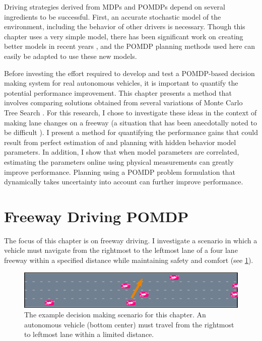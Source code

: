 Driving strategies derived from MDPs and POMDPs depend on several ingredients to be successful.
First, an accurate stochastic model of the environment, including the behavior of other drivers is necessary. 
Though this chapter uses a very simple model, there has been significant work on creating better models in recent years \cite{grindele2015trafficmodel, WheelerRobbelKochenderfer2015, sadigh2014}, and the POMDP planning methods used here can easily be adapted to use these new models.

Before investing the effort required to develop and test a POMDP-based decision making system for real autonomous vehicles, it is important to quantify the potential performance improvement.
This chapter presents a method that involves comparing solutions obtained from several variations of Monte Carlo Tree Search \cite{browne2012mcts}.
For this research, I chose to investigate these ideas in the context of making lane changes on a freeway (a situation that has been anecdotally noted to be difficult \cite{naughton2015freeway}).
I present a method for quantifying the performance gains that could result from perfect estimation of and planning with hidden behavior model parameters.
In addition, I show that when model parameters are correlated, estimating the parameters online using physical measurements can greatly improve performance. Planning using a POMDP problem formulation that dynamically takes uncertainty into account can further improve performance.

\section{Freeway Driving POMDP} \label{sec:multilanepomdp}

The focus of this chapter is on freeway driving.
I investigate a scenario in which a vehicle must navigate from the rightmost to the leftmost lane of a four lane freeway within a specified distance while maintaining safety and comfort (see \cref{fig:scene}).

\begin{figure}[tb]
    \centering
    \includegraphics[width=\columnwidth]{media/scene.png}
    \caption[Lane changing scenario]{The example decision making scenario for this chapter. An autonomous vehicle (bottom center) must travel from the rightmost to leftmost lane within a limited distance.}
    \label{fig:scene}
\end{figure}

